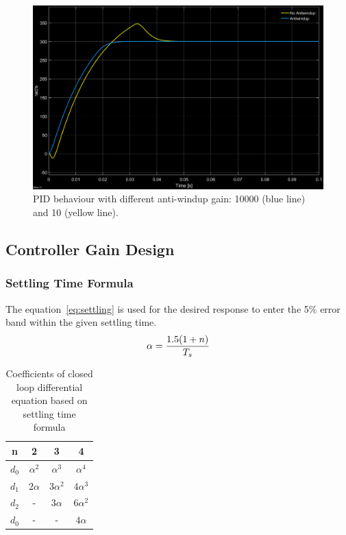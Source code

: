 \begin{figure}[!h]
	\centering
	\includegraphics[width=.75\linewidth]{graphics/pidwindupvaluecomp}
	\caption{PID behaviour with different anti-windup gain: 10000 (blue line) and 10 (yellow line).}
	\label{fig:pidwindupvaluecomp}
\end{figure}


\subsection{Controller Gain Design}

\subsubsection{Settling Time Formula}

The equation~\ref{eq:settling} is used for the desired response to enter the 5$\%$ error band within the given settling time.
\begin{equation}
\centering
\label{eq:settling}
\alpha = \dfrac{1.5(1 + n)}{T_s}
\end{equation}

\begin{table}[!h]
	\caption{ Coefficients of
		closed loop differential
		equation based on settling
		time formula\cite{feedback}}
	\centering
	\begin{tabular}{|c|c|c|c|}
		\hline
		n & 2 & 3 & 4\\
		\hline
		$d_0$ & $\alpha^2$ & $\alpha^3$ & $\alpha^4$\\ 
		$d_1$ & $2\alpha$ & $3\alpha^2$ & $4\alpha^3$\\
		$d_2$ & - & $3\alpha$ & $6\alpha^2$\\
		$d_0$ & - & - & $4\alpha$\\
		\hline	
		
	\end{tabular}
	\label{table:coefsettlingtime}
\end{table}


